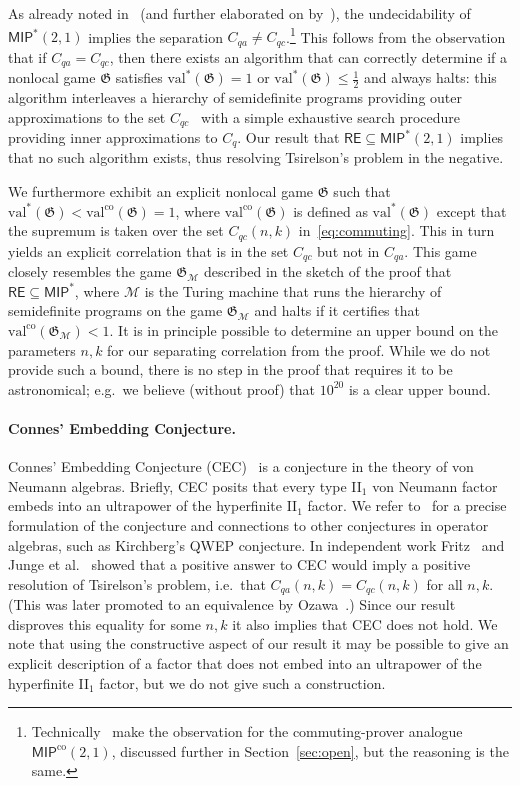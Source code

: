 \documentclass[11pt]{article}
\theoremstyle{definition}
\newcommand{\val}{\ensuremath{\mathrm{val}}}
\newcommand{\valco}{\ensuremath{\mathrm{val}^{\mathrm{co}}}}
\newcommand{\game}{\mathfrak{G}}
\newcommand{\class}[1]{\ensuremath{\mathsf{#1}}\xspace}
\newcommand{\MIP}{\class{MIP}} %
\newcommand{\MIPco}{\class{MIP^{\mathrm{co}}}} %
\newcommand{\RE}{\class{RE}} %
\newcommand{\machine}{\cal{M}}
\renewcommand{\cal}[1]{\mathcal{#1}}
\begin{document}
As already noted in~\cite{fritz2014can} (and further elaborated on by~\cite{fitzsimons2018quantum}), the undecidability of $\MIP^*(2,1)$ %
implies the separation $C_{qa} \neq C_{qc}$.\footnote{Technically~\cite{fritz2014can} make the observation for the commuting-prover analogue $\MIPco(2,1)$, discussed further in Section~\ref{sec:open}, but the reasoning is the same.} This follows from the observation that if $C_{qa} = C_{qc}$, then there exists an algorithm that can correctly determine if a nonlocal game $\game$ satisfies $\val^*(\game)=1$ or $\val^*(\game)\leq  \frac{1}{2}$ and always halts: this algorithm interleaves a hierarchy of semidefinite programs providing outer approximations to the set $C_{qc}$~\cite{navascues2008convergent,doherty2008quantum} with a simple exhaustive search procedure providing inner approximations to $C_{q}$. Our result that $\RE \subseteq \MIP^*(2,1)$ implies that no such algorithm exists, thus resolving Tsirelson's problem in the negative.

We furthermore exhibit an explicit nonlocal game $\game$ such that $\val^*(\game) < \valco(\game) = 1$, where $\valco(\game)$ is defined as $\val^*(\game)$ except that the supremum is taken over the set $C_{qc}(n,k)$ in~\eqref{eq:commuting}. This in turn yields an explicit correlation that is in the set $C_{qc}$ but not in $C_{qa}$. This game closely resembles the game $\game_\machine$ described in the sketch of the proof that $\RE \subseteq \MIP^*$, where $\machine$ is the Turing machine that runs the hierarchy of semidefinite programs on the game $\game_\machine$ and halts if it certifies that $\valco(\game_\machine) < 1$. It is in principle possible to determine an upper bound on the parameters $n,k$ for our separating correlation from the proof. While we do not provide such a bound, there is no step in the proof that requires it to be astronomical; e.g.\ we believe (without proof) that $10^{20}$ is a clear upper bound.

\paragraph{Connes' Embedding Conjecture.} 
Connes' Embedding Conjecture (CEC)~\cite{connes1976classification} is a conjecture in the theory of von Neumann algebras. Briefly, CEC posits that every type II$_1$ von Neumann factor embeds into an ultrapower of the hyperfinite II$_1$ factor. We refer to~\cite{ozawa2013connes} for a precise formulation of the conjecture and connections to other conjectures in operator algebras, such as  Kirchberg's QWEP conjecture. In independent work Fritz~\cite{fritz2012tsirelson} and Junge et al.~\cite{junge2011connes} showed that a positive answer to CEC would imply a positive resolution of Tsirelson's problem, i.e.\ that $C_{qa}(n,k)=C_{qc}(n,k)$ for all $n,k$. (This was later promoted to an equivalence by Ozawa~\cite{ozawa2013connes}.) Since our result disproves this equality for some $n,k$ it also implies that CEC does not hold.
We note that using the constructive aspect of our result it may be possible to give an explicit description of a factor that does not embed into an ultrapower of the hyperfinite II$_1$ factor, but we do not give such a construction. 
\end{document}
